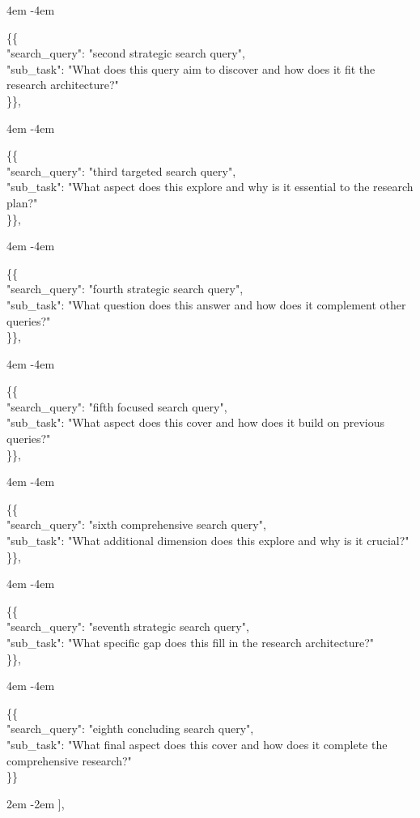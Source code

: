 \documentclass{article} %
\newcommand{\mlblock}[2][2em]{%
  {\begingroup
   \par\noindent
   \parshape=1 #1 \dimexpr\linewidth-#1\relax
   #2\par
   \endgroup}%
}
\newcommand{\tab}{\hspace*{2em}}
\begin{document}
\begin{examplebox}
\mlblock[4em]{
\{\{ \\
\tab "search\_query": "second strategic search query",\\
\tab "sub\_task": "What does this query aim to discover and how does it fit the research \tab architecture?"\\
\}\},}

\mlblock[4em]{
\{\{ \\
\tab "search\_query": "third targeted search query",\\
\tab "sub\_task": "What aspect does this explore and why is it essential to the research plan?"\\
\}\},}

\mlblock[4em]{
\{\{ \\
\tab "search\_query": "fourth strategic search query",\\
\tab "sub\_task": "What question does this answer and how does it complement other queries?"\\
\}\},}

\mlblock[4em]{
\{\{ \\
\tab "search\_query": "fifth focused search query",\\
\tab "sub\_task": "What aspect does this cover and how does it build on previous queries?"\\
\}\},}

\mlblock[4em]{
\{\{ \\
\tab "search\_query": "sixth comprehensive search query",\\
\tab "sub\_task": "What additional dimension does this explore and why is it crucial?"\\
\}\},}

\mlblock[4em]{
\{\{ \\
\tab "search\_query": "seventh strategic search query",\\
\tab "sub\_task": "What specific gap does this fill in the research architecture?"\\
\}\},}

\mlblock[4em]{
\{\{ \\
\tab "search\_query": "eighth concluding search query",\\
\tab "sub\_task": "What final aspect does this cover and how does it complete the comprehensive \tab research?"\\
\}\}}
\mlblock[2em]{],} \\


\end{examplebox}
\end{document}
